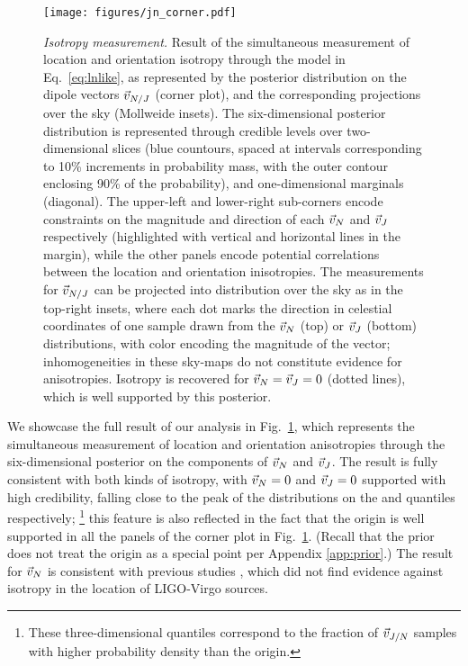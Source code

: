 \documentclass[aps,prd,twocolumn,superscriptaddress,preprintnumbers,floatfix,nofootinbib]{revtex4-2}
\newcommand{\clJ}{}
\newcommand{\clN}{}
\begin{document}
\begin{figure*}[p]
\texttt{[image: figures/jn\_corner.pdf]}
\caption{\emph{Isotropy measurement.} Result of the simultaneous measurement of location and orientation isotropy through the model in Eq.~\eqref{eq:lnlike}, as represented by the posterior distribution on the dipole vectors $\vec{v}_{N/J}$ (corner plot), and the corresponding projections over the sky (Mollweide insets).
The six-dimensional posterior distribution is represented through credible levels over two-dimensional slices (blue countours, spaced at intervals corresponding to 10\% increments in probability mass, with the outer contour enclosing 90\% of the probability), and one-dimensional marginals (diagonal).
The upper-left and lower-right sub-corners encode constraints on the magnitude and direction of each $\vec{v}_{N}$ and $\vec{v}_{J}$ respectively (highlighted with vertical and horizontal lines in the margin), while the other panels encode potential correlations between the location and orientation inisotropies.
The measurements for $\vec{v}_{N/J}$ can be projected into distribution over the sky as in the top-right insets, where each dot marks the direction in celestial coordinates of one sample drawn from the $\vec{v}_{N}$ (top) or $\vec{v}_{J}$ (bottom) distributions, with color encoding the magnitude of the vector; inhomogeneities in these sky-maps do not constitute evidence for anisotropies.
Isotropy is recovered for $\vec{v}_{N} = \vec{v}_{J} = 0$ (dotted lines), which is well supported by this posterior.
}
\label{fig:jn_corner}
\end{figure*}

We showcase the full result of our analysis in Fig.~\ref{fig:jn_corner}, which represents the simultaneous measurement of location and orientation anisotropies through the six-dimensional posterior on the components of $\vec{v}_{N}$ and $\vec{v}_{J}$.
The result is fully consistent with both kinds of isotropy, with $\vec{v}_{N} = 0$ and $\vec{v}_{J} = 0$ supported with high credibility, falling close to the peak of the distributions on the \clN and \clJ quantiles respectively;%
\footnote{These three-dimensional quantiles correspond to the fraction of $\vec{v}_{J/N}$ samples with higher probability density than the origin.}
 this feature is also reflected in the fact that the origin is well supported in all the panels of the corner plot in Fig.~\ref{fig:jn_corner}.
(Recall that the prior does not treat the origin as a special point per Appendix \ref{app:prior}.)
The result for $\vec{v}_{N}$ is consistent with previous studies \cite{Essick:2022slj}, which did not find evidence against isotropy in the location of LIGO-Virgo sources.
\end{document}
